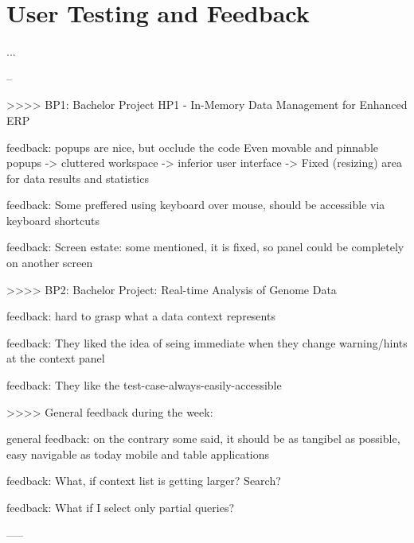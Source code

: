 
\section{User Testing and Feedback}
\label{sec:USER_TESTING}
...



--

>>>> BP1:
Bachelor Project HP1 - In-Memory Data Management for Enhanced ERP


feedback: popups are nice, but occlude the code
Even movable and pinnable popups -> cluttered workspace -> inferior user interface
-> Fixed (resizing) area for data results and statistics 

feedback: Some preffered using keyboard over mouse, should be accessible via keyboard shortcuts


feedback: Screen estate: some mentioned, it is fixed, so panel could be completely on another screen

>>>> BP2:
Bachelor Project: Real-time Analysis of Genome Data

feedback: hard to grasp what a data context represents

feedback: They liked the idea of seing immediate when they change warning/hints at the context panel


feedback: They like the test-case-always-easily-accessible


>>>> General feedback during the week:

general feedback: on the contrary some said, it should be as tangibel as possible,
easy navigable as today mobile and table applications

feedback: What, if context list is getting larger? Search?

feedback: What if I select only partial queries?





-----
